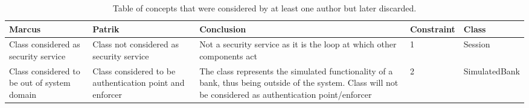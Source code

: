 \begin{sidewaystable}
\begin{center}
\captionsetup{justification=centering}
\caption{Table of concepts that were considered by at least one author but later discarded.}
\label{tab:groundtruthconceptnotincluded}
\hspace*{-2cm}
\begin{tabular}{p{4cm}p{4cm}p{6cm}ll}
\textbf{Marcus} & \textbf{Patrik} & \textbf{Conclusion} & \textbf{Constraint} & \textbf{Class} \\
\hline
Class considered as security service & Class not considered as security service & Not a security service as it is the loop at which other components act & 1 & Session \\
\rowcolor{RowColor}
Class considered to be out of system domain & Class considered to be authentication point and enforcer & The class represents the simulated functionality of a bank, thus being outside of the system. Class will not be considered as authentication point/enforcer & 2 & SimulatedBank \\
\hline
\end{tabular}
\end{center}
\end{sidewaystable}